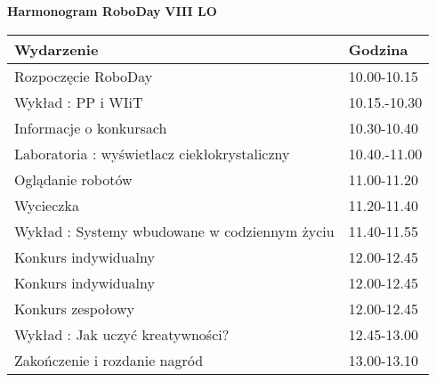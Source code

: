 \documentclass{article}
\begin{document}
\begin{center}
\Large\textbf{Harmonogram RoboDay}
\large\textbf{VIII LO}
\end{center}
\vspace{1cm}
\begin{center}
\begin{tabular}{|l|l|}
\hline
\textbf{Wydarzenie} & \textbf{Godzina} \\
\hline
Rozpoczęcie RoboDay & 10.00-10.15 \\
\hline
Wykład : PP i WIiT & 10.15.-10.30 \\
\hline
Informacje o konkursach & 10.30-10.40 \\
\hline
Laboratoria : wyświetlacz ciekłokrystaliczny & 10.40.-11.00 \\
\hline
Oglądanie robotów & 11.00-11.20 \\
\hline
Wycieczka & 11.20-11.40 \\
\hline
Wykład : Systemy wbudowane w codziennym życiu & 11.40-11.55 \\
\hline
Konkurs indywidualny & 12.00-12.45 \\
\hline
Konkurs indywidualny & 12.00-12.45 \\
\hline
Konkurs zespołowy & 12.00-12.45 \\
\hline
Wykład : Jak uczyć kreatywności? & 12.45-13.00 \\
\hline
Zakończenie i rozdanie nagród & 13.00-13.10 \\
\hline
\end{tabular}
\end{center}
\end{document}

